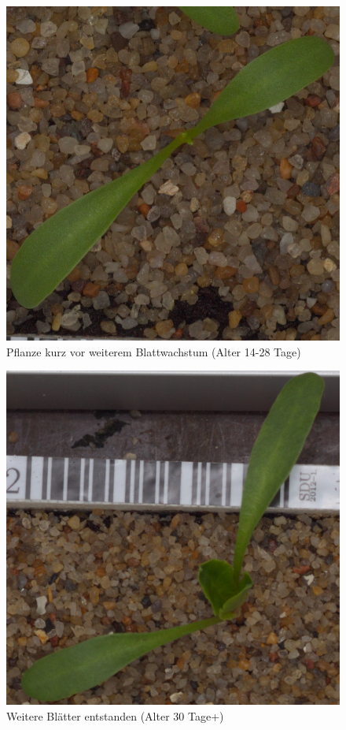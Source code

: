 \begin{figure}
    \centering
    \includegraphics[width=0.6\linewidth]{60.png}
    \caption{Pflanze kurz vor weiterem Blattwachstum (Alter 14-28 Tage)}
    \label{fig:enter-label}
\end{figure}
\begin{figure}
    \centering
    \includegraphics[width=0.6\linewidth]{444.png}
    \caption{Weitere Blätter entstanden (Alter 30 Tage+)}
    \label{fig:enter-label}
\end{figure}
